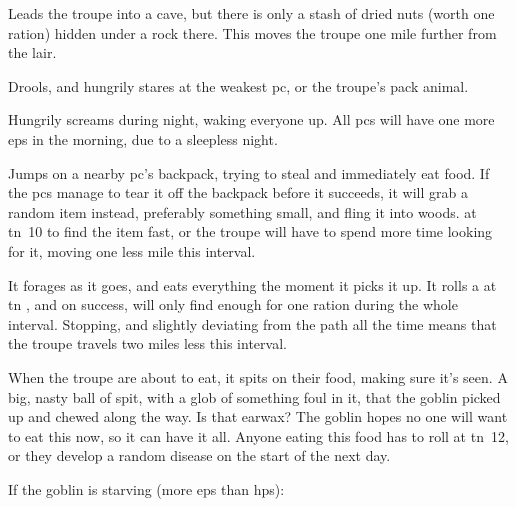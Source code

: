 \documentclass[10pt,twoside]{book}
\begin{document}
\begin{dlist}
  \item
  Leads the troupe into a cave, but there is only a stash of dried nuts (worth one \gls{ration}) hidden under a rock there.
  This moves the troupe one mile further from the lair.
  \item
  Drools, and hungrily stares at the weakest \gls{pc}, or the troupe's pack animal.
  \item
  Hungrily screams during night, waking everyone up.
  All \glspl{pc} will have one more \glspl{ep} in the morning, due to a sleepless night.
  \item
  Jumps on a nearby \gls{pc}'s backpack, trying to steal and immediately eat food.
  If the \glspl{pc} manage to tear it off the backpack before it succeeds, it will grab a random item instead, preferably something small, and fling it into woods.
   at \gls{tn}~10 to find the item fast, or the troupe will have to spend more time looking for it, moving one less mile this \gls{interval}.
  \item
  It forages as it goes, and eats everything the moment it picks it up.
  It rolls a  at \gls{tn}
  \ifcase{}%
  \fi, and on success, will only find enough for one \gls{ration} during the whole \gls{interval}.
  Stopping, and slightly deviating from the path all the time means that the troupe travels two miles less this \gls{interval}.
  \item
  When the troupe are about to eat, it spits on their food, making sure it's seen.
  A big, nasty ball of spit, with a glob of something foul in it, that the goblin picked up and chewed along the way.
  Is that earwax?
  The goblin hopes no one will want to eat this now, so it can have it all.
  Anyone eating this food has to roll  at \gls{tn}~12, or they develop a random disease%
  on the start of the next day.
\end{dlist}

If the goblin is starving (more \glspl{ep} than \glspl{hp}):
\end{document}
